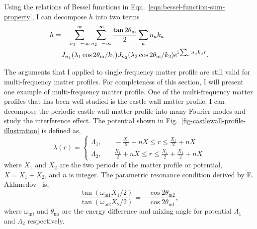 
Using the relations of Bessel functions in Eqn.~\ref{eqn:bessel-function-sum-property}, I can decompose $h$ into two terms
\begin{align}
    h =& -\sum_{n_1 = -\infty}^\infty \sum_{n_2 = -\infty}^\infty  \frac{\tan 2\theta_\mathrm m}{2} \sum_a n_a k_a \\
    & J_{n_1} ( \lambda_1 \cos 2\theta_\mathrm m/k_1)  J_{n_2} ( \lambda_2 \cos 2\theta_\mathrm m/k_2)  e^{  \mathrm{i} \sum_a n_a k_a r } .
\end{align}

The arguments that I applied to single frequency matter profile are still valid for multi-frequency matter profiles. For completeness of this section, I will present one example of multi-frequency matter profile. One of the multi-frequency matter profiles that has been well studied is the castle wall matter profile. I can decompose the periodic castle wall matter profile into many Fourier modes and study the interference effect. The potential shown in Fig.~\ref{fig-castlewall-profile-illustration} is defined as,
\begin{equation}
    \lambda(r) = \begin{cases}
\Lambda_1, &\quad -\frac{X_1}{2}+nX\le r\le \frac{X_1}{2}+nX \\
\Lambda_2, &\quad \frac{X_1}{2}+nX\le r\le \frac{X_1}{2}+\frac{X_2}{2} +nX
\end{cases}
\label{eq-castle-wall-potential}
\end{equation}
where $X_1$ and $X_2$ are the two periods of the matter profile or potential, $X=X_1+X_2$, and $n$ is integer. The parametric resonance condition derived by E. Akhmedov~\cite{Akhmedov2000} is,
\begin{equation}
    \frac{\tan (\omega_{\mathrm m1}X_1/2)}{\tan (\omega_{\mathrm m2}X_2/2)} = - \frac{\cos 2\theta_{\mathrm m2}}{\cos 2\theta_{\mathrm m1}},
    \label{eq-akhmedov-resonance-condition-castle-wall}
\end{equation}
where $\omega_{\mathrm{m}i}$ and $\theta_{\mathrm{m}i}$ are the energy difference and mixing angle for potential $\Lambda_1$ and $\Lambda_2$ respectively.


